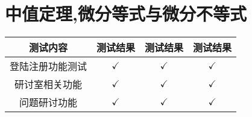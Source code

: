 \documentclass[8pt a4paper, oneside, UTF8]{ctexbook}  %
\begin{document}
\begin{sloppypar}
    \else
    \fi
    \chapter{中值定理,微分等式与微分不等式}
    \begin{table}[]
        \begin{tabular}{cccc}
        \hline
        测试内容     & \multicolumn{1}{l}{测试结果} & 测试结果 & 测试结果 \\ \hline
        登陆注册功能测试 & $\checkmark$                       & $\checkmark$   & $\checkmark$   \\ \hline
        研讨室相关功能  & $\checkmark$                       & $\checkmark$   & $\checkmark$   \\ \hline
        问题研讨功能   & $\checkmark$                       & $\checkmark$   & $\checkmark$   \\ \hline
        \end{tabular}
        \end{table}
    \ifx\allfiles\undefined
\end{sloppypar}
\end{document}
